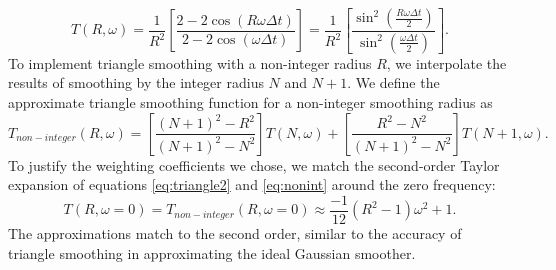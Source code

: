 \begin{equation}
T(R,\omega) = \frac{1}{R^{2}}\left[\frac{2-2\cos(R\omega\Delta t)}{2-2\cos(\omega\Delta t)}\right] = \frac{1}{R^{2}}\left[\frac{\sin^2(\frac{R\omega\Delta t}{2})}{\sin^2(\frac{\omega\Delta t}{2})}\right].
\label{eq:triangle2}
\end{equation}
To implement triangle smoothing with a non-integer radius $R$, we interpolate the results of smoothing by the integer radius $N$ and $N+1$. We define the approximate triangle smoothing function for a non-integer smoothing radius as
\begin{equation}
T_{non-integer}(R,\omega) = \left[\frac{(N+1)^2-R^2}{(N+1)^2-N^2} \right]T(N,\omega) + \left[\frac{R^2-N^2}{(N+1)^2-N^2}\right]T(N+1,\omega).
\label{eq:nonint}
\end{equation}
To justify the weighting coefficients we chose, we match the second-order Taylor expansion of equations \ref{eq:triangle2} and \ref{eq:nonint} around the zero frequency:
\begin{equation}
T(R,\omega=0)=T_{non-integer}(R,\omega=0)\approx \frac{-1}{12}(R^2-1)\omega^2+1.
\end{equation}
The approximations match to the second order, similar to the accuracy of triangle smoothing in approximating the ideal Gaussian smoother. 

